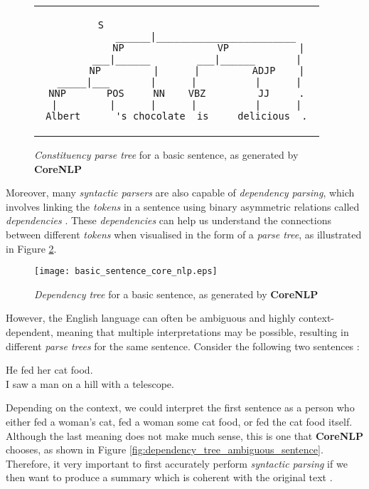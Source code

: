\begin{figure}[H]
\centering
\begin{tabular}{c}
\begin{lstlisting}[numbers=none, basicstyle=\ttfamily, columns=fixed]
                   S                          
             ______|________________________   
            NP                VP            | 
         ___|______        ___|______       |  
        NP         |      |         ADJP    | 
   _____|___       |      |          |      |  
 NNP       POS     NN    VBZ         JJ     . 
  |         |      |      |          |      |  
Albert      's chocolate  is     delicious  .
\end{lstlisting}
\end{tabular}
\caption{\textit{Constituency parse tree} for a basic sentence, as generated by  \textbf{CoreNLP}}
\label{fig:constituency_tree_basic_sentence}
\end{figure}

\noindent
Moreover, many \textit{syntactic parsers} are also capable of \textit{dependency parsing}, which involves linking the \textit{tokens} in a sentence using binary asymmetric relations called \textit{dependencies} \cite{kubler_dependency_nodate}. These \textit{dependencies} can help us understand the connections between different \textit{tokens} when visualised in the form of a \textit{parse tree}, as illustrated in Figure \ref{fig:dependency_tree_basic_sentence}.

\begin{figure}[H]
\centering
\texttt{[image: basic\_sentence\_core\_nlp.eps]}
\caption{\textit{Dependency tree} for a basic sentence, as generated by  \textbf{CoreNLP}}
\label{fig:dependency_tree_basic_sentence}
\end{figure}

\noindent
However, the English language can often be ambiguous and highly context-dependent, meaning that multiple interpretations may be possible, resulting in different \textit{parse trees} for the same sentence. Consider the following two sentences \cite{noauthor_studying_nodate}:

\begin{displayquote}
He fed her cat food. \\
I saw a man on a hill with a telescope.
\end{displayquote}

\noindent
Depending on the context, we could interpret the first sentence as a person who either fed a woman's cat, fed a woman some cat food, or fed the cat food itself. Although the last meaning does not make much sense, this is one that \textbf{CoreNLP} chooses, as shown in Figure \ref{fig:dependency_tree_ambiguous_sentence}. Therefore, it very important to first accurately perform \textit{syntactic parsing} if we then want to produce a summary which is coherent with the original text \cite{gomez-rodriguez_how_2019}.

